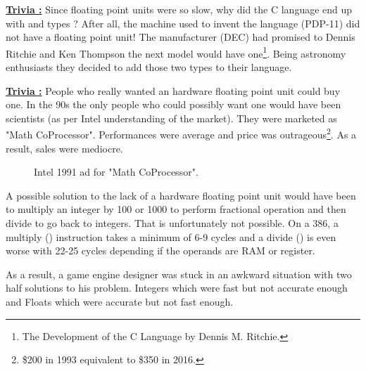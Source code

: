 \documentclass[book.tex]{subfiles}
\begin{document}
 \textbf{\underline{Trivia :}} Since floating point units were so slow, why did the C language end up with  and  types ? After all, the machine used to invent the language (PDP-11) did not have a floating point unit! The manufacturer (DEC) had promised to Dennis Ritchie and Ken Thompson the next model would have one\footnote{The Development of the C Language by Dennis M. Ritchie.}. Being astronomy enthusiasts they decided to add those two types to their language.\\
\par


\textbf{\underline{Trivia :}} People who really wanted an hardware floating point unit could buy one. In the 90s the only people who could possibly want one would have been scientists (as per Intel understanding of the market). They were marketed as "Math CoProcessor". Performances were average and price was outrageous\footnote{\$200 in 1993 equivalent to \$350 in 2016.}. As a result, sales were mediocre.\\
\begin{figure}[H]
\centering
\caption{Intel 1991 ad for "Math CoProcessor".}
\label{fig:fp_internals}
\end{figure}



\par
A possible solution to the lack of a hardware floating point unit would have been to multiply an integer by 100 or 1000 to perform fractional operation and then divide to go back to integers. That is unfortunately not possible. On a 386, a multiply () instruction takes a minimum of 6-9 cycles and a divide () is even worse with 22-25 cycles depending if the operands are RAM or register.\\ 
\par
As a result, a game engine designer was stuck in an awkward situation with two half solutions to his problem. Integers which were fast but not accurate enough and Floats which were accurate but not fast enough.\\
\par
  
\end{document}
